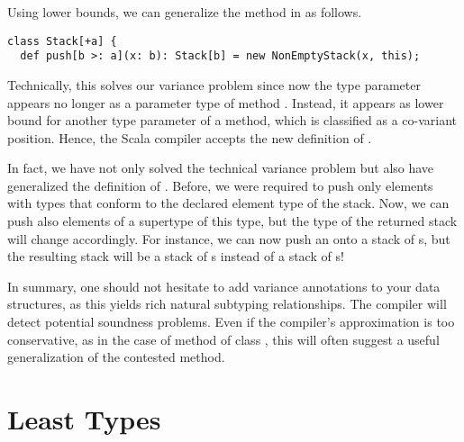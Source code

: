 Using lower bounds, we can generalize the  method in
 as follows.
\begin{lstlisting}
class Stack[+a] {
  def push[b >: a](x: b): Stack[b] = new NonEmptyStack(x, this);
\end{lstlisting}
Technically, this solves our variance problem since now the type
parameter  appears no longer as a parameter type of method
. Instead, it appears as lower bound for another type
parameter of a method, which is classified as a co-variant position.
Hence, the Scala compiler accepts the new definition of .

In fact, we have not only solved the technical variance problem but
also have generalized the definition of .  Before, we were
required to push only elements with types that conform to the declared
element type of the stack. Now, we can push also elements of a
supertype of this type, but the type of the returned stack will change
accordingly. For instance, we can now push an  onto a
stack of s, but the resulting stack will be a stack of
s instead of a stack of s!

In summary, one should not hesitate to add variance annotations to
your data structures, as this yields rich natural subtyping
relationships. The compiler will detect potential soundness
problems. Even if the compiler's approximation is too conservative, as
in the case of method  of class , this will
often suggest a useful generalization of the contested method.

\section{Least Types}

